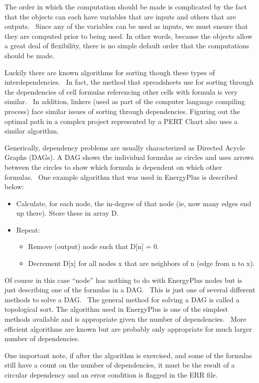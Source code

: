The order in which the computation should be made is complicated by the fact that the objects can each have variables that are inputs and others that are outputs.~ Since any of the variables can be used as inputs, we must ensure that they are computed prior to being used. In other words, because the objects allow a great deal of flexibility, there is no simple default order that the computations should be made.

Luckily there are known algorithms for sorting though these types of interdependencies.~ In fact, the method that spreadsheets use for sorting through the dependencies of cell formulas referencing other cells with formula is very similar.~ In addition, linkers (used as part of the computer language compiling process) face similar issues of sorting through dependencies. Figuring out the optimal path in a complex project represented by a PERT Chart also uses a similar algorithm.

Generically, dependency problems are usually characterized as Directed Acycle Graphs (DAGs). A DAG shows the individual formulas as circles and uses arrows between the circles to show which formula is dependent on which other formulas.~ One example algorithm that was used in EnergyPlus is described below:

\begin{itemize}
\item Calculate, for each node, the in-degree of that node (ie, now many edges end up there). Store these in array D.
\item Repeat:
\begin{itemize}
\item Remove (output) node such that D{[}n{]} = 0.
\item Decrement D{[}x{]} for all nodes x that are neighbors of n (edge from n to x).
\end{itemize}
\end{itemize}

Of course in this case ``node'' has nothing to do with EnergyPlus nodes but is just describing one of the formulas in a DAG.~ This is just one of several different methods to solve a DAG.~ The general method for solving a DAG is called a topological sort. The algorithm used in EnergyPlus is one of the simplest methods available and is appropriate given the number of dependencies.~ More efficient algorithms are known but are probably only appropriate for much larger number of dependencies.

One important note, if after the algorithm is exercised, and some of the formulas still have a count on the number of dependencies, it must be the result of a circular dependency and an error condition is flagged in the ERR file.

